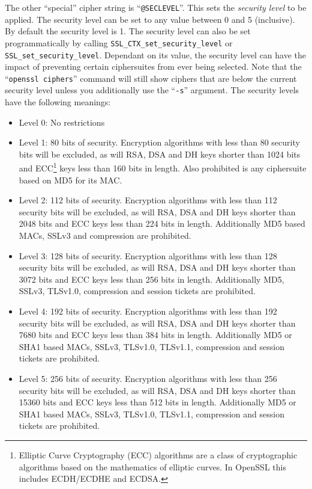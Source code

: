 The other ``special'' cipher string is ``\verb!@SECLEVEL!''. This sets the
\emph{security level} to be applied. The security level can be set to any value
between 0 and 5 (inclusive). By default the security level is 1. The security
level can also be set programmatically by calling
\verb!SSL_CTX_set_security_level! or \verb!SSL_set_security_level!. Dependant
on its value, the security level can have the impact of preventing certain
ciphersuites from ever being selected. Note that the ``\verb!openssl ciphers!''
command will still show ciphers that are below the current security level
unless you additionally use the ``\verb!-s!'' argument. The security levels
have the following meanings:
\begin{itemize}
\item Level 0: No restrictions
\item Level 1: 80 bits of security. Encryption algorithms with less than 80
security bits will be excluded, as will RSA, DSA and DH keys shorter than 1024
bits and ECC\footnote{Elliptic Curve Cryptography (ECC) algorithms are a class
of cryptographic algorithms based on the mathematics of elliptic curves. In
OpenSSL this includes ECDH/ECDHE and ECDSA.} keys less than 160 bits in length.
Also prohibited is any ciphersuite based on MD5 for its MAC.
\item Level 2: 112 bits of security.  Encryption algorithms with less than 112
security bits will be excluded, as will RSA, DSA and DH keys shorter than 2048
bits and ECC keys less than 224 bits in length. Additionally MD5 based MACs,
SSLv3 and compression are prohibited.
\item Level 3: 128 bits of security.  Encryption algorithms with less than 128
security bits will be excluded, as will RSA, DSA and DH keys shorter than 3072
bits and ECC keys less than 256 bits in length. Additionally MD5, SSLv3,
TLSv1.0, compression and session tickets are prohibited.
\item Level 4: 192 bits of security. Encryption algorithms with less than 192
security bits will be excluded, as will RSA, DSA and DH keys shorter than 7680
bits and ECC keys less than 384 bits in length. Additionally MD5 or SHA1 based
MACs, SSLv3, TLSv1.0, TLSv1.1, compression and session tickets are prohibited.
\item Level 5: 256 bits of security. Encryption algorithms with less than 256
security bits will be excluded, as will RSA, DSA and DH keys shorter than 15360
bits and ECC keys less than 512 bits in length. Additionally MD5 or SHA1 based
MACs, SSLv3, TLSv1.0, TLSv1.1, compression and session tickets are prohibited.
\end{itemize}

